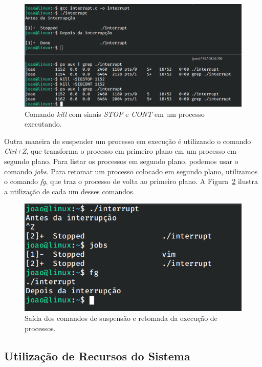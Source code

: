 \documentclass[
	12pt,				%
	oneside,   	        %
	a4paper,			%
	english,			%
	french,				%
	spanish,			%
	brazil,				%
	]{pacotes/abntex2}
\begin{document}
\begin{figure}[H]
  \centering
  \includegraphics[scale=0.45]{figuras/signal.png}
  \caption{Comando \textit{kill} com sinais \textit{STOP} e \textit{CONT} em um processo executando.}
  \label{fig:signal}
\end{figure}

Outra maneira de suspender um processo em execução é utilizando o comando \textit{Ctrl+Z}, que transforma o processo em primeiro plano em um processo em segundo plano. Para listar os processos em segundo plano, podemos usar o comando \textit{jobs}. Para retomar um processo colocado em segundo plano, utilizamos o comando \textit{fg}, que traz o processo de volta ao primeiro plano. A Figura~\ref{fig:background} ilustra a utilização de cada um desses comandos.

\begin{figure}[H]
  \centering
  \includegraphics[scale=0.45]{figuras/background.png}
  \caption{Saída dos comandos de suspensão e retomada da execução de processos.}
  \label{fig:background}
\end{figure}

\subsection{Utilização de Recursos do Sistema}
\label{subsec:recursos}
\end{document}
